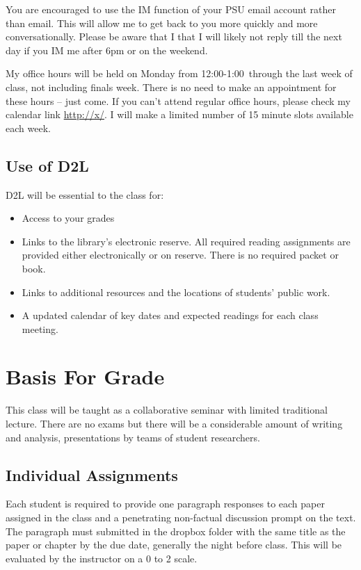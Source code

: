 \documentclass[letterpaper,10pt]{article}
\newcommand{\Office}{on Monday from 12:00-1:00}
\begin{document}
You are encouraged to use the IM function of your PSU email account rather than email. This will allow me to get back to you more quickly and more conversationally. Please be aware that I that I will likely not reply till the next day if you IM me after 6pm or on the weekend.  

My office hours will be held \Office \ through the last week of class, not including finals week. There is no need to make an appointment for these hours -- just come. If you can't attend regular office hours, please check my calendar link \url{http://x/}. I will make a limited number of 15 minute slots available each week. 

\subsection{Use of D2L}

D2L will be essential to the class for:

\begin{itemize}
\item Access to your grades

\item Links to the library's electronic reserve. All required reading
  assignments are provided either electronically or on reserve.  There is no required
  packet or book.

\item Links to additional resources and the locations of students'
  public work.

\item A updated calendar of key dates and expected readings for each
  class meeting.
 
\end{itemize}
  


\section{Basis For Grade}

This class will be taught as a collaborative seminar with limited
traditional lecture. There are no exams but there will be a
considerable amount of writing and analysis, presentations by teams of
student researchers.

\subsection{Individual Assignments}
 Each student is required to provide one paragraph responses to
  each paper assigned in the class and a penetrating non-factual
  discussion prompt on the text.  The paragraph must submitted in the dropbox folder with the same title as the paper or chapter by the due date, generally the night before class. This will be evaluated by the instructor on a 0 to 2 scale. 
\end{document}
